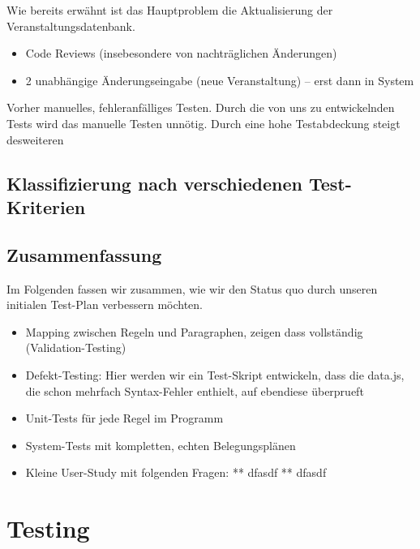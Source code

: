 \documentclass[ngerman]{article}
\begin{document}
Wie bereits erwähnt ist das Hauptproblem die Aktualisierung der Veranstaltungsdatenbank.

\begin{itemize}
    \item
        Code Reviews (insebesondere von nachträglichen Änderungen)
    \item
        2 unabhängige Änderungseingabe (neue Veranstaltung) -- erst dann in System
\end{itemize}

Vorher manuelles, fehleranfälliges Testen. Durch die von uns zu
entwickelnden Tests wird das manuelle Testen unnötig. Durch eine hohe
Testabdeckung steigt desweiteren

\subsection{Klassifizierung nach verschiedenen Test-Kriterien}


\subsection{Zusammenfassung}
\label{sec:zusammenfassung}

Im Folgenden fassen wir zusammen, wie wir den Status quo durch unseren initialen Test-Plan verbessern möchten.

\begin{itemize}
    \item Mapping zwischen Regeln und Paragraphen, zeigen dass vollständig (Validation-Testing)
    \item
        Defekt-Testing: Hier werden wir ein Test-Skript entwickeln, dass die data.js, die schon mehrfach Syntax-Fehler enthielt, auf ebendiese überprueft
    \item
        Unit-Tests für jede Regel im Programm
    \item
        System-Tests mit kompletten, echten Belegungsplänen
    \item
        Kleine User-Study mit folgenden Fragen: ** dfasdf ** dfasdf
\end{itemize}


\section{Testing}
\end{document}
